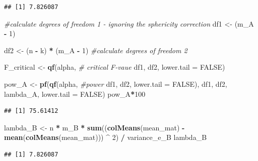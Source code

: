\documentclass[
]{book}
\newenvironment{Shaded}{\begin{snugshade}}{\end{snugshade}}
\newcommand{\CommentTok}[1]{\textcolor[rgb]{0.56,0.35,0.01}{\textit{#1}}}
\newcommand{\DataTypeTok}[1]{\textcolor[rgb]{0.13,0.29,0.53}{#1}}
\newcommand{\DecValTok}[1]{\textcolor[rgb]{0.00,0.00,0.81}{#1}}
\newcommand{\KeywordTok}[1]{\textcolor[rgb]{0.13,0.29,0.53}{\textbf{#1}}}
\newcommand{\NormalTok}[1]{#1}
\newcommand{\OperatorTok}[1]{\textcolor[rgb]{0.81,0.36,0.00}{\textbf{#1}}}
\newcommand{\OtherTok}[1]{\textcolor[rgb]{0.56,0.35,0.01}{#1}}
\newcommand{\StringTok}[1]{\textcolor[rgb]{0.31,0.60,0.02}{#1}}
\begin{document}
\begin{verbatim}
## [1] 7.826087
\end{verbatim}

\begin{Shaded}
\begin{Highlighting}[]
\CommentTok{#calculate degrees of freedom 1 - ignoring the sphericity correction}
\NormalTok{df1 <-}\StringTok{ }\NormalTok{(m_A }\OperatorTok{-}\StringTok{ }\DecValTok{1}\NormalTok{) }

\NormalTok{df2 <-}\StringTok{ }\NormalTok{(n }\OperatorTok{-}\StringTok{ }\NormalTok{k) }\OperatorTok{*}\StringTok{ }\NormalTok{(m_A }\OperatorTok{-}\StringTok{ }\DecValTok{1}\NormalTok{) }\CommentTok{#calculate degrees of freedom 2}

\NormalTok{F_critical <-}\StringTok{ }\KeywordTok{qf}\NormalTok{(alpha, }\CommentTok{# critical F-vaue}
\NormalTok{                 df1,}
\NormalTok{                 df2, }
                 \DataTypeTok{lower.tail =} \OtherTok{FALSE}\NormalTok{) }

\NormalTok{pow_A <-}\StringTok{ }\KeywordTok{pf}\NormalTok{(}\KeywordTok{qf}\NormalTok{(alpha, }\CommentTok{#power }
\NormalTok{             df1, }
\NormalTok{             df2, }
             \DataTypeTok{lower.tail =} \OtherTok{FALSE}\NormalTok{), }
\NormalTok{          df1, }
\NormalTok{          df2, }
\NormalTok{          lambda_A, }
          \DataTypeTok{lower.tail =} \OtherTok{FALSE}\NormalTok{)}
\NormalTok{pow_A}\OperatorTok{*}\DecValTok{100}
\end{Highlighting}
\end{Shaded}

\begin{verbatim}
## [1] 75.61412
\end{verbatim}

\begin{Shaded}
\begin{Highlighting}[]
\NormalTok{lambda_B <-}
\StringTok{  }\NormalTok{n }\OperatorTok{*}\StringTok{ }\NormalTok{m_B }\OperatorTok{*}\StringTok{ }\KeywordTok{sum}\NormalTok{((}\KeywordTok{colMeans}\NormalTok{(mean_mat) }\OperatorTok{-}\StringTok{ }
\StringTok{                   }\KeywordTok{mean}\NormalTok{(}\KeywordTok{colMeans}\NormalTok{(mean_mat))) }\OperatorTok{^}\StringTok{ }\DecValTok{2}\NormalTok{) }\OperatorTok{/}\StringTok{ }\NormalTok{variance_e_B }
\NormalTok{lambda_B}
\end{Highlighting}
\end{Shaded}

\begin{verbatim}
## [1] 7.826087
\end{verbatim}
\end{document}
